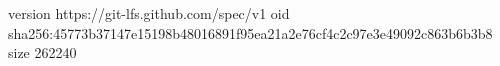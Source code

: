 version https://git-lfs.github.com/spec/v1
oid sha256:45773b37147e15198b48016891f95ea21a2e76cf4c2c97e3e49092c863b6b3b8
size 262240
